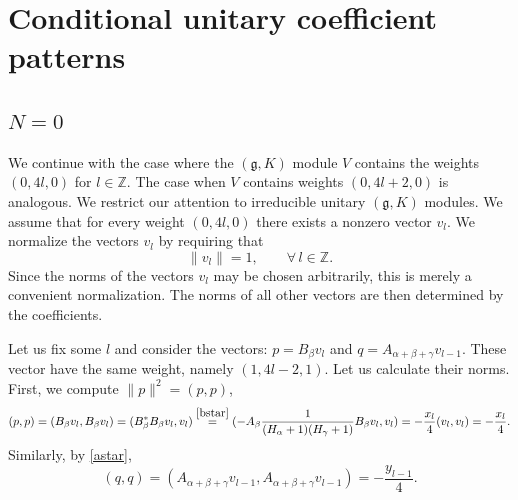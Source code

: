\documentclass[twoside,a4paper,12pt]{article}
\newcommand{\g}{\ensuremath{\mathfrak g}}
\newcommand{\Z}{\ensuremath{\mathbb Z}}
\theoremstyle{definition}
\begin{document}
\section{\texorpdfstring{Conditional unitary coefficient patterns}
	{Conditional unitary coefficient patterns}}

\subsection{\texorpdfstring{$N=0$}{N=0}}\label{nis0}

We continue with the case where the $(\g,K)$ module $V$ contains the
weights $(0,4l,0)$ for $l\in\Z$. The case when $V$ contains weights $(0,4l+2,0)$
is analogous. We restrict our attention to irreducible unitary $(\g,K)$ modules.
We assume that for every weight $(0,4l,0)$ there exists a nonzero vector $v_l$.
We normalize the vectors $v_l$ by requiring that
\begin{equation*}
	\|v_l\|=1,\qquad \forall\, l\in\Z.
\end{equation*}
Since the norms of the vectors $v_l$ may be chosen arbitrarily, this is merely
a convenient normalization. The norms of all other vectors are then determined
by the coefficients.

Let us fix some $l$ and consider the vectors: $p=B_\beta v_l$ and
$q=A_{\alpha+\beta+\gamma}v_{l-1}$. These vector have the same weight, namely
$(1,4l-2,1)$. Let us calculate their norms. First, we compute $\|p\|^2=(p,p)$,
\begin{equation*}
	(p,p)=(B_\beta v_l,B_\beta v_l)=(B_\beta^*B_\beta v_l,v_l)
	\stackrel{\eqref{bstar}}{=}
	(-A_\beta\frac1{(H_\alpha+1)(H_\gamma+1)}B_\beta v_l,v_l)=
	-\frac{x_l}4(v_l,v_l)=-\frac{x_l}4.
\end{equation*}
Similarly, by \eqref{astar},
\begin{equation*}
	(q,q)=(A_{\alpha+\beta+\gamma}v_{l-1},A_{\alpha+\beta+\gamma}v_{l-1})=
	-\frac{y_{l-1}}4.
\end{equation*}
\end{document}
